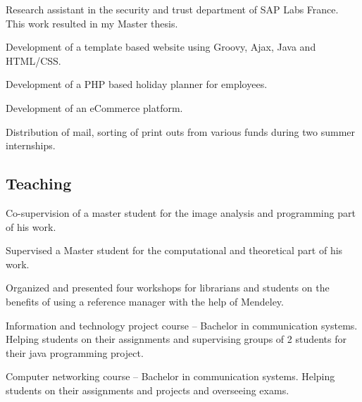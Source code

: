 \documentclass[11pt,a4paper,nolmodern, sans]{moderncv}        %
\begin{document}

{Research assistant in the security and trust department of SAP Labs France. This work resulted in my Master thesis.}

{Development of a template based website using Groovy, Ajax, Java and HTML/CSS.}{}

{Development of a PHP based holiday planner for employees.}

{Development of an eCommerce platform.}

{Distribution of mail, sorting of print outs from various funds during two summer internships.}


\subsection{Teaching}

{Co-supervision of a master student for the image analysis and programming part of his work.
}

{Supervised a Master student for the computational and theoretical part of his work. }

{Organized and presented four workshops for librarians and students on the benefits of using a reference manager with the help of Mendeley.
}

{Information and technology project course -- Bachelor in communication systems. Helping students on their assignments and supervising groups of 2 students for their java programming project.}

{Computer networking course -- Bachelor in communication systems. Helping students on their assignments and projects and overseeing exams.}
\end{document}
